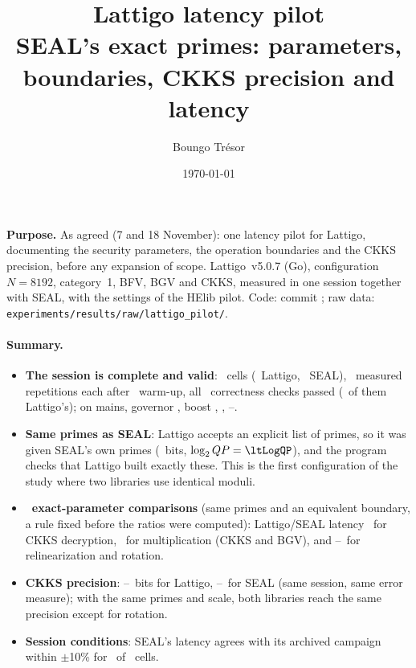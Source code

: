 \documentclass[11pt]{article}
\title{Lattigo latency pilot\\[2pt]
\large SEAL's exact primes: parameters, boundaries, CKKS precision and latency}
\author{Boungo Tr\'esor}
\date{\today}
\begin{document}
\maketitle

\noindent\textbf{Purpose.} As agreed (7 and 18 November): one latency pilot for Lattigo, documenting the security parameters, the operation boundaries and the CKKS precision, before any expansion of scope. Lattigo~v5.0.7 (Go), configuration $N{=}8192$, category~1, BFV, BGV and CKKS, measured in one session together with SEAL, with the settings of the HElib pilot. Code: commit \texttt{\ltCommit}; raw data: \texttt{experiments/results/raw/lattigo\_pilot/}.

\paragraph{Summary.}
\begin{itemize}[leftmargin=*, itemsep=2pt]
  \item \textbf{The session is complete and valid}: \ltCells\ cells (\ltLattigoCells\ Lattigo, \ltSealCells\ SEAL), \ltReps\ measured repetitions each after \ltWarm\ warm-up, all \ltAllChecks\ correctness checks passed (\ltLattigoChecks\ of them Lattigo's); on mains, governor \ltGovernor, boost \ltBoost, \ltDate, \ltStart--\ltEnd.
  \item \textbf{Same primes as SEAL}: Lattigo accepts an explicit list of primes, so it was given SEAL's own primes (\ltChain\ bits, $\log_2 QP = \ltLogQP$), and the program checks that Lattigo built exactly these. This is the first configuration of the study where two libraries use identical moduli.
  \item \textbf{\ltExactN\ exact-parameter comparisons} (same primes and an equivalent boundary, a rule fixed before the ratios were computed): Lattigo/SEAL latency \ltRatioDecCkks\ for CKKS decryption, \ltRatioMulMin\ for multiplication (CKKS and BGV), and \ltRatioKsMin--\ltRatioKsMax\ for relinearization and rotation.
  \item \textbf{CKKS precision}: \ltPrecLatMin--\ltPrecLatMax\ bits for Lattigo, \ltPrecSealMin--\ltPrecSealMax\ for SEAL (same session, same error measure); with the same primes and scale, both libraries reach the same precision except for rotation.
  \item \textbf{Session conditions}: SEAL's latency agrees with its archived campaign within $\pm$10\% for \ltReproEq\ of \ltReproN\ cells.
\end{itemize}
\end{document}
